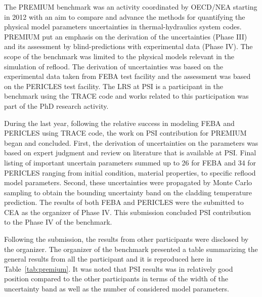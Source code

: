 \documentclass[11pt,titlepage]{article}
\begin{document}
The PREMIUM benchmark was an activity coordinated by OECD/NEA starting in 2012 
with an aim to compare and advance the methods for quantifying the physical 
model parameters uncertainties in thermal-hydraulics system codes.
PREMIUM put an emphasis on the derivation of the uncertainties (Phase III) and 
its assessment by blind-predictions with experimental data (Phase IV).
The scope of the benchmark was limited to the physical models relevant in the 
simulation of reflood.
The derivation of uncertainties was based on the experimental data taken from 
FEBA test facility and the assessment was based on the PERICLES test facility.
The LRS at PSI is a participant in the benchmark using the TRACE code and 
works related to this participation was part of the PhD research activity.

During the last year, following the relative success in modeling FEBA and 
PERICLES using TRACE code, the work on PSI contribution for PREMIUM began 
and concluded.
First, the derivation of uncertainties on the parameters was based on expert 
judgment and review on literature that is available at PSI.
Final listing of important uncertain parameters summed up to 26 for FEBA and 
34 for PERICLES ranging from initial condition, material properties, to 
specific reflood model parameters.
Second, these uncertainties were propagated by Monte Carlo sampling to obtain
the bounding uncertainty band on the cladding temperature prediction.
The results of both FEBA and PERICLES were the submitted to CEA as the 
organizer of Phase IV. 
This submission concluded PSI contribution to the Phase IV of the benchmark.

Following the submission, the results from other participants were disclosed by
the organizer.
The organizer of the benchmark presented a table summarizing the general results
from all the participant and it is reproduced here in Table~\ref{tab:premium}.
It was noted that PSI results was in relatively good position compared to the
other participants in terms of the width of the uncertainty band as well as the
number of considered model parameters.
\end{document}
